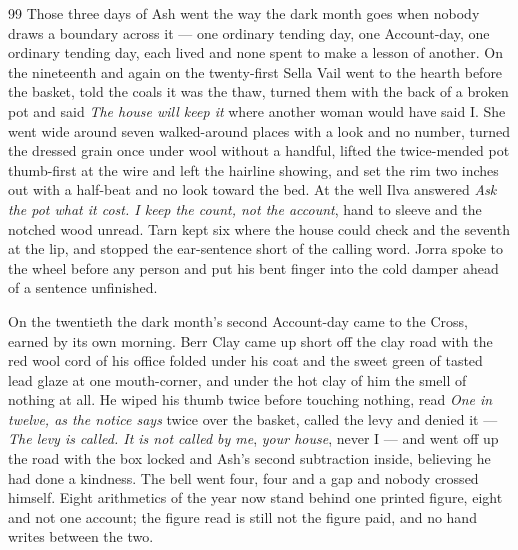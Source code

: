
\scenebreak


\scenebreak


\scenebreak

\CRtailpiece
\begin{CRchronicle}{99}
Those three days of Ash went the way the dark month goes when nobody draws a boundary across it — one ordinary tending day, one Account-day, one ordinary tending day, each lived and none spent to make a lesson of another. On the nineteenth and again on the twenty-first Sella Vail went to the hearth before the basket, told the coals it was the thaw, turned them with the back of a broken pot and said \emph{The house will keep it} where another woman would have said I. She went wide around seven walked-around places with a look and no number, turned the dressed grain once under wool without a handful, lifted the twice-mended pot thumb-first at the wire and left the hairline showing, and set the rim two inches out with a half-beat and no look toward the bed. At the well Ilva answered \emph{Ask the pot what it cost. I keep the count, not the account}, hand to sleeve and the notched wood unread. Tarn kept six where the house could check and the seventh at the lip, and stopped the ear-sentence short of the calling word. Jorra spoke to the wheel before any person and put his bent finger into the cold damper ahead of a sentence unfinished.

On the twentieth the dark month’s second Account-day came to the Cross, earned by its own morning. Berr Clay came up short off the clay road with the red wool cord of his office folded under his coat and the sweet green of tasted lead glaze at one mouth-corner, and under the hot clay of him the smell of nothing at all. He wiped his thumb twice before touching nothing, read \emph{One in twelve, as the notice says} twice over the basket, called the levy and denied it — \emph{The levy is called. It is not called by me}, \emph{your house}, never I — and went off up the road with the box locked and Ash’s second subtraction inside, believing he had done a kindness. The bell went four, four and a gap and nobody crossed himself. Eight arithmetics of the year now stand behind one printed figure, eight and not one account; the figure read is still not the figure paid, and no hand writes between the two.


\end{CRchronicle}
